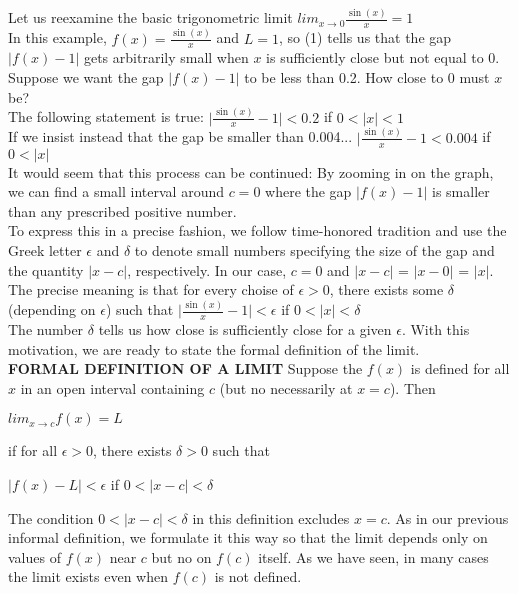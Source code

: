 \documentclass{article}
\begin{document}
	Let us reexamine the basic trigonometric limit $lim_{x \to 0}\frac{\sin(x)}{x} = 1$\\

	In this example, $f(x) = \frac{\sin(x)}{x}$ and $L = 1$, so (1) tells us that the gap $\lvert f(x) - 1\rvert$ gets arbitrarily small when $x$ is sufficiently close but not equal to 0.\\
	Suppose we want the gap $\lvert f(x) - 1\rvert$ to be less than 0.2. How close to 0 must $x$ be?\\
	The following statement is true: $\lvert \frac{\sin(x)}{x} - 1\rvert < 0.2$ if $0 < \lvert x\rvert < 1$\\

	If we insist instead that the gap be smaller than 0.004... $\lvert \frac{\sin(x)}{x} - 1 < 0.004$ if $0 < \lvert x\rvert$\\

	It would seem that this process can be continued: By zooming in on the graph, we can find a small interval around $c = 0$ where the gap $\lvert f(x) - 1\rvert$ is smaller than any prescribed positive number.\\
	To express this in a precise fashion, we follow time-honored tradition and use the Greek letter $\epsilon$ and $\delta$ to denote small numbers specifying the size of the gap and the quantity $\lvert x - c\rvert$, respectively. In our case, $c = 0$ and $\lvert x - c\rvert$ = $\lvert x - 0\rvert$ = $\lvert x\rvert$. The precise meaning is that for every choise of $\epsilon > 0$, there exists some $\delta$ (depending on $\epsilon$) such that $\lvert \frac{\sin(x)}{x} - 1\rvert < \epsilon$ if $0 < \lvert x\rvert < \delta$\\

	The number $\delta$ tells us how close is sufficiently close for a given $\epsilon$. With this motivation, we are ready to state the formal definition of the limit.\\

	\textbf{FORMAL DEFINITION OF A LIMIT} Suppose the $f(x)$ is defined for all $x$ in an open interval containing $c$ (but no necessarily at $x = c$). Then \begin{center}$lim_{x \to c}f(x) = L$\end{center} if for all $\epsilon > 0$, there exists $\delta > 0$ such that \begin{center}$\lvert f(x) - L\rvert<\epsilon$ if $0<\lvert x - c\rvert<\delta$\end{center} The condition $0 < \lvert x - c\rvert < \delta$ in this definition excludes $x = c$. As in our previous informal definition, we formulate it this way so that the limit depends only on values of $f(x)$ near $c$ but no on $f(c)$ itself. As we have seen, in many cases the limit exists even when $f(c)$ is not defined.
\end{document}
